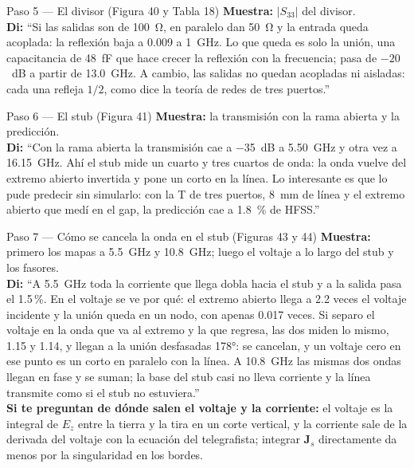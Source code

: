 \documentclass[11pt,letterpaper]{article}
\begin{document}
\begin{paso}{Paso 5 --- El divisor (Figura 40 y Tabla 18)}
\textbf{Muestra:} $|S_{33}|$ del divisor.\\
\textbf{Di:} ``Si las salidas son de \SI{100}{\ohm}, en paralelo dan \SI{50}{\ohm} y la entrada queda acoplada: la reflexión baja a 0.009 a \SI{1}{GHz}. Lo que queda es solo la unión, una capacitancia de \SI{48}{fF} que hace crecer la reflexión con la frecuencia; pasa de $-20$~dB a partir de \SI{13.0}{GHz}. A cambio, las salidas no quedan acopladas ni aisladas: cada una refleja $1/2$, como dice la teoría de redes de tres puertos.''
\end{paso}

\begin{paso}{Paso 6 --- El stub (Figura 41)}
\textbf{Muestra:} la transmisión con la rama abierta y la predicción.\\
\textbf{Di:} ``Con la rama abierta la transmisión cae a \SI{-35}{dB} a \SI{5.50}{GHz} y otra vez a \SI{16.15}{GHz}. Ahí el stub mide un cuarto y tres cuartos de onda: la onda vuelve del extremo abierto invertida y pone un corto en la línea. Lo interesante es que lo pude predecir sin simularlo: con la T de tres puertos, \SI{8}{mm} de línea y el extremo abierto que medí en el gap, la predicción cae a \SI{1.8}{\percent} de HFSS.''
\end{paso}

\begin{paso}{Paso 7 --- Cómo se cancela la onda en el stub (Figuras 43 y 44)}
\textbf{Muestra:} primero los mapas a \SI{5.5}{GHz} y \SI{10.8}{GHz}; luego el voltaje a lo largo del stub y los fasores.\\
\textbf{Di:} ``A \SI{5.5}{GHz} toda la corriente que llega dobla hacia el stub y a la salida pasa el 1.5\,\%. En el voltaje se ve por qué: el extremo abierto llega a 2.2 veces el voltaje incidente y la unión queda en un nodo, con apenas 0.017 veces. Si separo el voltaje en la onda que va al extremo y la que regresa, las dos miden lo mismo, 1.15 y 1.14, y llegan a la unión desfasadas \ang{178}: se cancelan, y un voltaje cero en ese punto es un corto en paralelo con la línea. A \SI{10.8}{GHz} las mismas dos ondas llegan en fase y se suman; la base del stub casi no lleva corriente y la línea transmite como si el stub no estuviera.''\\
\textbf{Si te preguntan de dónde salen el voltaje y la corriente:} el voltaje es la integral de $E_z$ entre la tierra y la tira en un corte vertical, y la corriente sale de la derivada del voltaje con la ecuación del telegrafista; integrar $\mathbf{J}_s$ directamente da menos por la singularidad en los bordes.
\end{paso}
\end{document}
